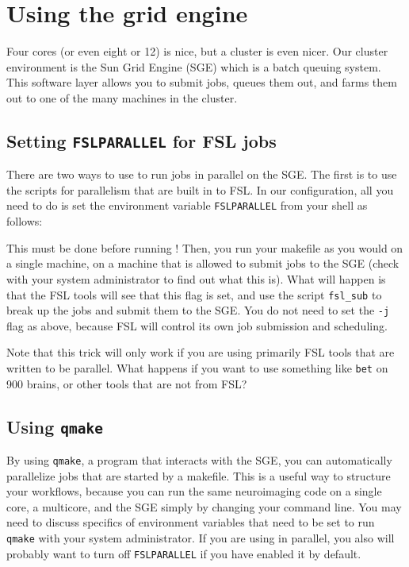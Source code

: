 \section{Using the grid engine}

Four cores (or even eight or 12) is nice, but a cluster is even nicer. Our cluster environment is the Sun Grid Engine (SGE) which is a batch queuing system. This software layer allows you to submit jobs, queues them out, and farms them out to one of the many machines in the cluster.

\subsection{Setting \texttt{FSLPARALLEL} for FSL jobs}

There are two ways to use \maken{} to run jobs in parallel on the SGE. The first is to use the scripts for parallelism that are built in to FSL. In our configuration, all you need to do is set the environment variable \texttt{FSLPARALLEL} from your shell as follows:

This must be done before running \maken! Then, you run your makefile as you would on a single machine, on a machine that is allowed to submit jobs to the SGE (check with your system administrator to find out what this is). What will happen is that the FSL tools will see that this flag is set, and use the script \texttt{fsl_sub} to break up the jobs and submit them to the SGE. You do not need to set the \texttt{-j} flag as above, because FSL will control its own job submission and scheduling. 

Note that this trick will only work if you are using primarily FSL tools that are written to be parallel. What happens if you want to use something like \texttt{bet} on 900 brains, or other tools that are not from FSL?

\subsection{Using \texttt{qmake}}

By using \texttt{qmake}, a program that interacts with the SGE, you can automatically parallelize jobs that are started by a makefile. This is a useful way to structure your workflows, because you can run the same neuroimaging code on a single core, a multicore, and the SGE simply by changing your command line. You may need to discuss specifics of environment variables that need to be set to run \texttt{qmake} with your system administrator. If you are using \maken{} in parallel, you also will probably want to turn off \texttt{FSLPARALLEL} if you have enabled it by default.

